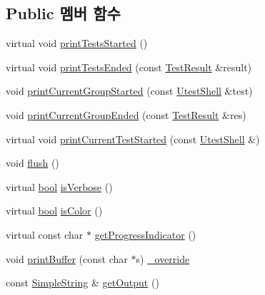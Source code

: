 \subsection*{Public 멤버 함수}
\begin{DoxyCompactItemize}
\item 
virtual void \hyperlink{class_composite_test_output_test_string_buffer_test_output_a40c1b0893711d211ca33bdbe7a1855c4}{print\+Tests\+Started} ()
\item 
virtual void \hyperlink{class_composite_test_output_test_string_buffer_test_output_a629e58a0cc5c9b16e154eb22a988129c}{print\+Tests\+Ended} (const \hyperlink{class_test_result}{Test\+Result} \&result)
\item 
void \hyperlink{class_composite_test_output_test_string_buffer_test_output_afe801c9e014df78dd6cd5e199ba8c6e0}{print\+Current\+Group\+Started} (const \hyperlink{class_utest_shell}{Utest\+Shell} \&test)
\item 
void \hyperlink{class_composite_test_output_test_string_buffer_test_output_a037b2a87826c7f59e7353cb137deacae}{print\+Current\+Group\+Ended} (const \hyperlink{class_test_result}{Test\+Result} \&res)
\item 
virtual void \hyperlink{class_composite_test_output_test_string_buffer_test_output_ad229379c27a8c56b0536c02ef283f028}{print\+Current\+Test\+Started} (const \hyperlink{class_utest_shell}{Utest\+Shell} \&)
\item 
void \hyperlink{class_composite_test_output_test_string_buffer_test_output_adac116554b543b7c4228c018a85882f5}{flush} ()
\item 
virtual \hyperlink{avb__gptp_8h_af6a258d8f3ee5206d682d799316314b1}{bool} \hyperlink{class_composite_test_output_test_string_buffer_test_output_ac3ff5ccaae3201281b2ddceafd7ce3a8}{is\+Verbose} ()
\item 
virtual \hyperlink{avb__gptp_8h_af6a258d8f3ee5206d682d799316314b1}{bool} \hyperlink{class_composite_test_output_test_string_buffer_test_output_a61add89d91b5e1ef5fc3fa0ba768b263}{is\+Color} ()
\item 
virtual const char $\ast$ \hyperlink{class_composite_test_output_test_string_buffer_test_output_a9c25a521c042efa502a1caab8da34d55}{get\+Progress\+Indicator} ()
\item 
void \hyperlink{class_string_buffer_test_output_a8b83bd531b9e38a5dd9c61e14bf1636c}{print\+Buffer} (const char $\ast$s) \hyperlink{_cpp_u_test_config_8h_a049bea15dd750e15869863c94c1efc3b}{\+\_\+override}
\item 
const \hyperlink{class_simple_string}{Simple\+String} \& \hyperlink{class_string_buffer_test_output_a17a31248a362b3190d2b195ba2a9616f}{get\+Output} ()

\end{DoxyCompactItemize}
